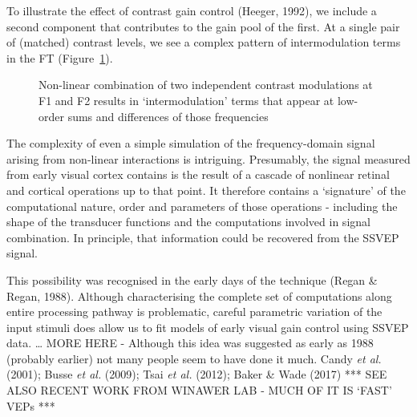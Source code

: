 \documentclass[
  letterpaper,
  DIV=11,
  numbers=noendperiod]{scrartcl}
\begin{document}
To illustrate the effect of contrast gain control (Heeger, 1992), we
include a second component that contributes to the gain pool of the
first. At a single pair of (matched) contrast levels, we see a complex
pattern of intermodulation terms in the FT
(Figure~\ref{fig-intermodulation}).

\begin{figure}


\caption{\label{fig-intermodulation}Non-linear combination of two
independent contrast modulations at F1 and F2 results in
`intermodulation' terms that appear at low-order sums and differences of
those frequencies}

\end{figure}%

The complexity of even a simple simulation of the frequency-domain
signal arising from non-linear interactions is intriguing. Presumably,
the signal measured from early visual cortex contains is the result of a
cascade of nonlinear retinal and cortical operations up to that point.
It therefore contains a `signature' of the computational nature, order
and parameters of those operations - including the shape of the
transducer functions and the computations involved in signal
combination. In principle, that information could be recovered from the
SSVEP signal.

This possibility was recognised in the early days of the technique
(Regan \& Regan, 1988). Although characterising the complete set of
computations along entire processing pathway is problematic, careful
parametric variation of the input stimuli does allow us to fit models of
early visual gain control using SSVEP data. \ldots{} MORE HERE -
Although this idea was suggested as early as 1988 (probably earlier) not
many people seem to have done it much. Candy \emph{et al.} (2001); Busse
\emph{et al.} (2009); Tsai \emph{et al.} (2012); Baker \& Wade (2017)
*** SEE ALSO RECENT WORK FROM WINAWER LAB - MUCH OF IT IS `FAST' VEPs
***
\end{document}
